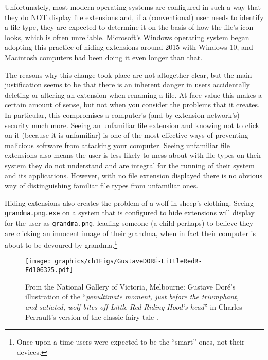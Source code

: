 Unfortunately, most modern operating systems are configured in such a way that they do NOT display file extensions and, if a (conventional) user needs to identify a file type, they are expected to determine it on the basis of how the file's icon looks, which is often unreliable. Microsoft's Windows operating system began adopting this practice of hiding extensions around 2015 with Windows 10, and Macintosh computers had been doing it even longer than that.

The reasons why this change took place are not altogether clear, but the main justification seems to be that there is an inherent danger in users accidentally deleting or altering an extension when renaming a file. At face value this makes a certain amount of sense, but not when you consider the problems that it creates. In particular, this compromises a computer's (and by extension network's) security much more. Seeing an unfamiliar file extension and knowing not to click on it (because it is unfamiliar) is one of the most effective ways of preventing malicious software from attacking your computer. Seeing unfamiliar file extensions also means the user is less likely to mess about with file types on their system they do not understand and are integral for the running of their system and its applications. However, with no file extension displayed there is no obvious way of distinguishing familiar file types from unfamiliar ones.

Hiding extensions also creates the problem of a wolf in sheep's clothing. Seeing \texttt{grandma.png.exe} on a system that is configured to hide extensions will display for the user as \texttt{grandma.png}, leading someone (a child perhaps) to believe they are clicking an innocent image of their grandma, when in fact their computer is about to be devoured by grandma.\footnote{Once upon a time users were expected to be the ``smart'' ones, not their devices.}

\vspace{1em}

\begin{figure}[h]
\centering
\texttt{[image: graphics/ch1Figs/GustaveDORÉ-LittleRedR-Fd106325.pdf]}
\caption{From the National Gallery of Victoria, Melbourne: Gustave Doré's illustration of the ``\textit{penultimate moment, just before the triumphant, and satiated, wolf bites off Little Red Riding Hood’s head}'' in Charles Perrault's version of the classic fairy tale \parencite{Dore1862}.}
\end{figure}

